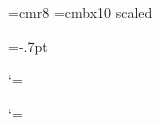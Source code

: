 \font\eightrm=cmr8
\font\elevenbf=cmbx10 scaled \magstephalf

\def\ttstrut{\relax\logicstrut\truthtablerowheight\truthtablerowdepth}
\def\ttfirstlinestrut{{\advance\truthtablerowdepth by\truthtablefirstrowdepthadjust\ttstrut}}

\newdimen\tthalfinteritemspace
\def\settthalfinteritemspace{\tthalfinteritemspace=.5\truthtableinteritemspace}

\newif\ifttfirstrow
\def\ttvrule{{%
	\vrule width\truthtablelinethickness%
	\ifttfirstrow\ttfirstlinestrut\else\ttstrut\fi%
}}

\def\makettcellmath{\def\ttcell{${}}}
\def\makettcellvalues{\global\def\ttcell{\eightrm\makeasteriskttValue\ignorebrackets}}

\newdimen\ttValueshift \ttValueshift=-.7pt
\let\ttValuefont=\elevenbf


\def\ttValue{\afterassignment\ttValueA\let\next=}
\def\ttValueA{\expandafter\ttValueB\next}
\def\ttValueB#1{%
	\ifx#1\relax\else%
		\raise\ttValueshift\hbox{\ttValuefont#1}%
	\fi%
}

\begingroup
\catcode`\*=\active
\gdef\makeasteriskttValue{%
	\catcode`\*=\active%
	\let*\ttValue\relax%
}
\endgroup

\def\ignorebrackets{%
	\ifx\endignorebrackets\undefined%
		\edef\endignorebrackets{%
			\catcode`\noexpand\[=\the\catcode`\[%
			\catcode`\noexpand\]=\the\catcode`\]\relax%
		}%
	\fi%
	\catcode`\[=9%
	\catcode`\]=9%
}

\def\truthtableline{%
	\ifmmode$\fi\cr\noalign{%
		\hrule height\truthtablelinethickness%
		\global\ttfirstrowfalse%
		\makettcellvalues%
	}%
}

\begingroup
\catcode`\+=\active
\gdef\makeplusttline{%
	\catcode`+=\active%
	\def+{%
		\global\let+=\relax%
		\truthtableline%
	}%
}
\endgroup



\newtoks\everytruthtable \everytruthtable{\relax}
\newtoks\everyendtruthtable \everyendtruthtable{\relax}

